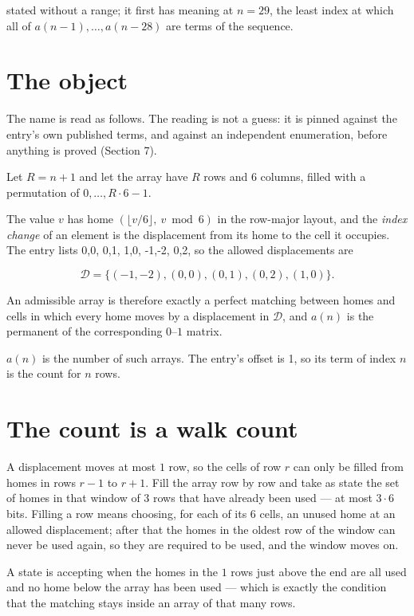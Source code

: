 \documentclass[11pt]{article}
\theoremstyle{definition}
\begin{document}
stated without a range; it first has meaning at $n = 29$, the least index at which all of $a(n-1),\dots,a(n-28)$ are terms of the sequence.

\section{The object}

The name is read as follows. The reading is not a guess: it is pinned against the entry's own published terms, and against an independent enumeration, before anything is proved (Section 7).

Let $R = n + 1$ and let the array have $R$ rows and $6$ columns, filled with a permutation of $0,\dots,R\cdot6-1$.

The value $v$ has home $(\lfloor v/6\rfloor,\ v \bmod 6)$ in the row-major layout, and the {\itshape index change} of an element is the displacement from its home to the cell it occupies. The entry lists 0,0, 0,1, 1,0, -1,-2, 0,2, so the allowed displacements are

\[\mathcal{D} = \{(-1,-2), (0,0), (0,1), (0,2), (1,0)\}.\]

An admissible array is therefore exactly a perfect matching between homes and cells in which every home moves by a displacement in $\mathcal{D}$, and $a(n)$ is the permanent of the corresponding $0$--$1$ matrix.

$a(n)$ is the number of such arrays. The entry's offset is 1, so its term of index $n$ is the count for $n$ rows.

\section{The count is a walk count}

A displacement moves at most $1$ row, so the cells of row $r$ can only be filled from homes in rows $r-1$ to $r+1$. Fill the array row by row and take as state the set of homes in that window of $3$ rows that have already been used --- at most $3\cdot6$ bits. Filling a row means choosing, for each of its $6$ cells, an unused home at an allowed displacement; after that the homes in the oldest row of the window can never be used again, so they are required to be used, and the window moves on.

A state is accepting when the homes in the $1$ rows just above the end are all used and no home below the array has been used --- which is exactly the condition that the matching stays inside an array of that many rows.
\end{document}
